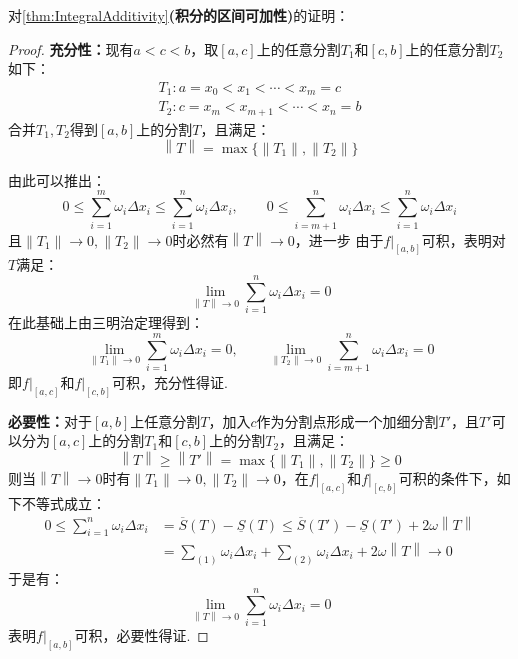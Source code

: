 对\cref{thm:IntegralAdditivity}\textbf{(积分的区间可加性)}的证明：
\begin{proof}
    \textbf{充分性：}现有$a<c<b$，取$[a,c]$上的任意分割$T_1$和$[c,b]$上的任意分割$T_2$如下：
    \begin{gather*}
        T_1:a=x_0<x_1<\cdots<x_m=c\\
        T_2:c=x_m<x_{m+1}<\cdots<x_n=b
    \end{gather*}
    合并$T_1,T_2$得到$[a,b]$上的分割$T$，且满足：
    \[\left\|T\right\| = \max\{\left\|T_1\right\|,\left\|T_2\right\|\}\]
    
    由此可以推出：
    \[0 \leqslant \sum_{i=1}^{m}\omega_i\Delta x_i \leqslant \sum_{i=1}^{n}\omega_i\Delta x_i,\qquad 0 \leqslant \sum_{i=m+1}^{n}\omega_i\Delta x_i \leqslant \sum_{i=1}^{n}\omega_i\Delta x_i\]
    且$\left\|T_1\right\|\to 0,\left\|T_2\right\|\to 0$时必然有$\left\|T\right\|\to 0$，进一步
    由于$\left.f\right|_{[a,b]}$可积，表明对$T$满足：
    \[\lim_{\left\|T\right\|\to 0}\sum_{i=1}^{n}\omega_i\Delta x_i = 0\]
    在此基础上由三明治定理得到：
    \[\lim_{\left\|T_1\right\|\to 0}\sum_{i=1}^{m}\omega_i\Delta x_i = 0,\qquad \lim_{\left\|T_2\right\|\to 0}\sum_{i=m+1}^{n}\omega_i\Delta x_i = 0\]
    即$\left.f\right|_{[a,c]}$和$\left.f\right|_{[c,b]}$可积，充分性得证.

    \textbf{必要性：}对于$[a,b]$上任意分割$T$，加入$c$作为分割点形成一个加细分割$T'$，且$T'$可以分为$[a,c]$上的分割$T_1$和$[c,b]$上的分割$T_2$，且满足：
    \[\left\|T\right\| \geqslant \left\|T'\right\| = \max\{\left\|T_1\right\|,\left\|T_2\right\|\} \geqslant 0\]
    则当$\left\|T\right\|\to 0$时有$\left\|T_1\right\|\to 0,\left\|T_2\right\|\to 0$，在$\left.f\right|_{[a,c]}$和$\left.f\right|_{[c,b]}$可积的条件下，如下不等式成立：
    \begin{align*}
        0\leqslant\sum_{i=1}^{n}\omega_i\Delta x_i &= \overline{S}(T) - \underline{S}(T) \leqslant \overline{S}(T')-\underline{S}(T') + 2\omega\left\|T\right\|\\
        &= \sum_{(1)}\omega_i\Delta x_i + \sum_{(2)}\omega_i\Delta x_i + 2\omega\left\|T\right\| \to 0
    \end{align*}
    于是有：
    \[\lim_{\left\|T\right\|\to 0}\sum_{i=1}^{n}\omega_i\Delta x_i = 0\]
    表明$\left.f\right|_{[a,b]}$可积，必要性得证.
\end{proof}

